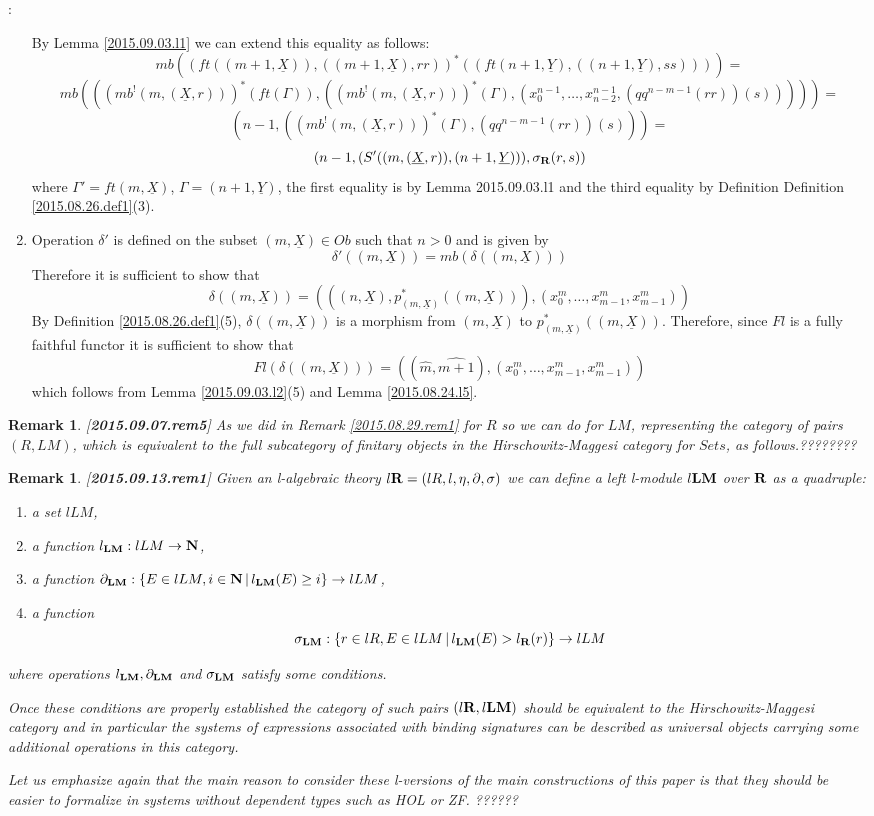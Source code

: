 \documentclass[11pt]{article}
\newenvironment{proof}{{\bf Proof}:}{\vskip 5mm }
\newtheorem{remark}[proposition]{Remark}
\newcommand{\llabel}[1]{\label{#1}[{\bf #1}]}
\newcommand{\sr}{\rightarrow}
\newcommand{\nn}{{\bf N\rm}}
\newcommand{\nat}{\nn}
\newcommand{\rr}{{\bf R}}
\newcommand{\lm}{{\bf LM}}
\newcommand{\uu}{\underline}
\newcommand{\wh}{\widehat}
\begin{document}
\begin{proof}
\begin{enumerate}
%
By Lemma \ref{2015.09.03.l1} we can extend this equality as follows:
%
$$mb((ft((m+1,\uu{X})),((m+1,\uu{X}),rr))^*((ft(n+1,\uu{Y}),((n+1,\uu{Y}),ss))))=$$
$$mb(((mb^!(m,(\uu{X},r)))^*(ft(\Gamma)),((mb^!(m,(\uu{X},r)))^*(\Gamma),(x_0^{n-1},\dots,x^{n-1}_{n-2},(qq^{n-m-1}(rr))(s)))))=$$
$$(n-1,((mb^!(m,(\uu{X},r)))^*(\Gamma),(qq^{n-m-1}(rr))(s)))=$$
$$(n-1,(S'((m,(\uu{X},r)),(n+1,\uu{Y}))),\sigma_{\rr}(r,s))$$
%
where $\Gamma'=ft(m,\uu{X})$, $\Gamma=(n+1,\uu{Y})$, the first equality is by Lemma {2015.09.03.l1} and the third equality by Definition Definition \ref{2015.08.26.def1}(3). 
\item Operation $\delta'$ is defined on the subset $(m,\uu{X})\in Ob$ such that $n>0$ and is given by
%
$$\delta'((m,\uu{X}))=mb(\delta((m,\uu{X})))$$
%
Therefore it is sufficient to show that
%
$$\delta((m,\uu{X}))=(((n,\uu{X}),p_{(m,\uu{X})}^*((m,\uu{X}))),(x_0^m,\dots,x_{m-1}^m,x_{m-1}^m))$$
%
By Definition \ref{2015.08.26.def1}(5), $\delta((m,\uu{X}))$ is a morphism from $(m,\uu{X})$ to $p_{(m,\uu{X})}^*((m,\uu{X}))$. Therefore, since $Fl$ is a fully faithful functor it is sufficient to show that 
%
$$Fl(\delta((m,\uu{X})))=((\wh{m},\wh{m+1}),(x_0^m,\dots,x_{m-1}^m,x_{m-1}^m))$$
%
which follows from Lemma \ref{2015.09.03.l2}(5) and Lemma \ref{2015.08.24.l5}.
%
\end{enumerate}
\end{proof}
%
\begin{remark}\rm
\llabel{2015.09.07.rem5}
As we did in Remark \ref{2015.08.29.rem1} for $R$ so we can do for $LM$, representing the category of pairs $(R,LM)$, which is equivalent to the full subcategory of finitary objects in the Hirschowitz-Maggesi category for $Sets$, as follows.????????
\end{remark}
%
\begin{remark}\rm
\llabel{2015.09.13.rem1}
Given an l-algebraic theory $l\rr=(lR,l,\eta,\partial,\sigma)$ we can define a left l-module $l\lm$ over $\rr$ as a quadruple:
%
\begin{enumerate}
\item a set $lLM$,
\item a function $l_{\lm}:lLM\sr \nn$,
\item a function $\partial_{\lm}:\{E\in lLM, i\in\nat\,|\, l_{\lm}(E)\ge i\}\sr lLM$,
\item a function 
%
$$\sigma_{\lm}:\{r\in lR,E\in lLM\,|\,l_{\lm}(E)>l_{\rr}(r)\}\sr lLM$$
%
\end{enumerate}
%
where operations $l_{\lm},\partial_{\lm}$ and $\sigma_{\lm}$ satisfy some conditions. 

Once these conditions are properly established the category of such pairs $(l\rr,l\lm)$ should be equivalent to the Hirschowitz-Maggesi category and in particular the systems of expressions associated with binding signatures can be described as universal objects carrying some additional operations in this category. 

Let us emphasize again that the main reason to consider these l-versions of the main constructions of this paper is that they should be easier to formalize in systems without dependent types such as HOL or ZF.  ??????
\end{remark} 
\end{document}
